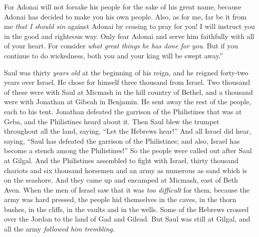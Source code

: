 \begin{biblechapter}
\verse For Adonai will not forsake his people for the sake of his great name, because Adonai has decided to make you his own people.
\verse Also, as for me, far be it from me \textit{that I should sin} against Adonai by ceasing to pray for you! I will instruct you in the good and righteous way.
\verse Only fear Adonai and serve him faithfully with all of your heart. For consider \textit{what great things he has done for you}.
\verse But if you continue to do wickedness, both you and your king will be swept away.”
\end{biblechapter}

\begin{biblechapter} %
 Saul was thirty \textit{years old} at the beginning of his reign, and he reigned forty-two years over Israel.
\verse He chose for himself three thousand from Israel. Two thousand of these were with Saul at Micmash in the hill country of Bethel, and a thousand were with Jonathan at Gibeah in Benjamin. He sent away the rest of the people, each to his tent.
\verse Jonathan defeated the garrison of the Philistines that was at Geba, and the Philistines heard about it. Then Saul blew the trumpet throughout all the land, saying, “Let the Hebrews hear!”
\verse And all Israel did hear, saying, “Saul has defeated the garrison of the Philistines; and also, Israel has become a stench among the Philistines!” So the people were called out after Saul at Gilgal.
 And the Philistines assembled to fight with Israel, thirty thousand chariots and six thousand horsemen and an army as numerous as sand which is on the seashore. And they came up and encamped at Micmash, east of Beth Aven.
\verse When the men of Israel saw that it was \textit{too difficult} for them, because the army was hard pressed, the people hid themselves in the caves, in the thorn bushes, in the cliffs, in the vaults and in the wells.
\verse Some of the Hebrews crossed over the Jordan to the land of Gad and Gilead. But Saul was still at Gilgal, and all the army \textit{followed him trembling}.

\end{biblechapter}
